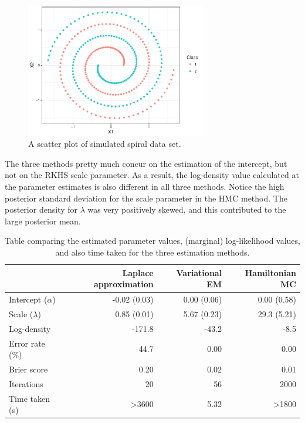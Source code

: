\begin{figure}[hbt]
  \centering
  \includegraphics[width=0.7\textwidth]{figure/05-example_data}
  \caption{A scatter plot of simulated spiral data set.}
  \vspace{-0.5em}
  \label{fig:exampleiprobit}
\end{figure}

The three methods pretty much concur on the estimation of the intercept, but not on the RKHS scale parameter.
As a result, the log-density value calculated at the parameter estimates is also different in all three methods.
Notice the high posterior standard deviation for the scale parameter in the HMC method.
The posterior density for $\lambda$ was very positively skewed, and this contributed to the large posterior mean.

\begin{table}[hbt]
\centering
\caption{Table comparing the estimated parameter values, (marginal) log-likelihood values, and also time taken for the three estimation methods.}
\label{tab:compreiprobit}
\begin{tabular}{@{}lrrr@{}}
\toprule
& Laplace approximation 
& Variational EM 
& Hamiltonian MC          \\ \midrule
Intercept ($\alpha$)      & -0.02 (0.03)           & 0.00 (0.06)    & 0.00 (0.58)  \\
Scale ($\lambda$)      & 0.85 (0.01)         & 5.67 (0.23)  & 29.3 (5.21)     \\[0.5em]
Log-density    & -171.8              & -43.2       & -8.5                  \\
Error rate (\%) & 44.7               & 0.00        & 0.00                   \\
Brier score & 0.20               & 0.02        & 0.01                   \\[0.5em]
Iterations     & 20                  & 56          & 2000                    \\
Time taken (s) & >3600                & 5.32         & >1800                     \\ \bottomrule
\end{tabular}
\end{table}



